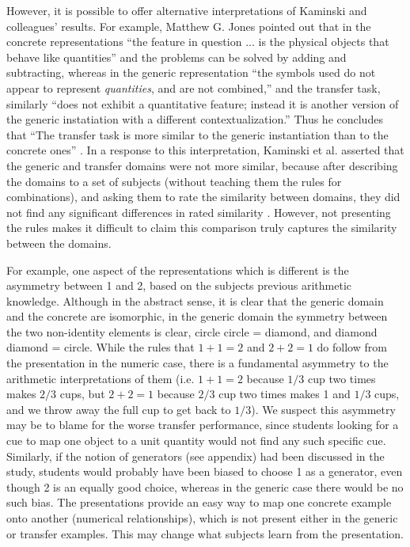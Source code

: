 \documentclass[man,10pt]{apa6}
\begin{document}
However, it is possible to offer alternative interpretations of Kaminski and colleagues' results. For example, Matthew G. Jones pointed out that in the concrete representations ``the feature in question ... is the physical objects that behave like quantities'' and the problems can be solved by adding and subtracting, whereas in the generic representation ``the symbols used do not appear to represent \emph{quantities}, and are not combined,'' and the transfer task, similarly ``does not exhibit a quantitative feature; instead it is another version of the generic instatiation with a different contextualization.'' Thus he concludes that ``The transfer task is more similar to the generic instantiation than to the concrete ones'' \cite{Jones2009}. In a response to this interpretation, Kaminski et al. asserted that the generic and transfer domains were not more similar, because after describing the domains to a set of subjects (without teaching them the rules for combinations), and asking them to rate the similarity between domains, they did not find any significant differences in rated similarity \cite{Kaminski2009}. However, not presenting the rules makes it difficult to claim this comparison truly captures the similarity between the domains. \par
For example, one aspect of the representations which is different is the asymmetry between 1 and 2, based on the subjects previous arithmetic knowledge. Although in the abstract sense, it is clear that the generic domain and the concrete are isomorphic, in the generic domain the symmetry between the two non-identity elements is clear, circle circle = diamond, and diamond diamond = circle. While the rules that $1+1=2$ and $2+2=1$ do follow from the presentation in the numeric case, there is a fundamental asymmetry to the arithmetic interpretations of them (i.e. $1+1 = 2$ because $1/3$ cup two times makes $2/3$ cups, but $2+2 = 1$ because $2/3$ cup two times makes 1 and $1/3$ cups, and we throw away the full cup to get back to $1/3$). We suspect this asymmetry may be to blame for the worse transfer performance, since students looking for a cue to map one object to a unit quantity would not find any such specific cue. Similarly, if the notion of generators (see appendix) had been discussed in the study, students would probably have been biased to choose 1 as a generator, even though 2 is an equally good choice, whereas in the generic case there would be no such bias. The presentations provide an easy way to map one concrete example onto another (numerical relationships), which is not present either in the generic or transfer examples. This may change what subjects learn from the presentation. \par
\end{document}
